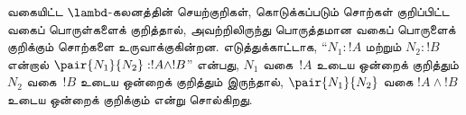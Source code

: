\documentclass[../../../include/open-logic-section]{subfiles}
\begin{document}
வகையிட்ட $\lambd$-கலனத்தின் செயற்குறிகள்,
கொடுக்கப்படும் சொற்கள் குறிப்பிட்ட வகைப் பொருள்களைக்
குறித்தால், அவற்றிலிருந்து பொருத்தமான வகைப்
பொருளைக் குறிக்கும் சொற்களை உருவாக்குகின்றன.
எடுத்துக்காட்டாக, “$N_1 : !A$ மற்றும் $N_2 : !B$
என்றால் $\pair{N_1}{N_2} : !A \land !B$”
என்பது, $N_1$ வகை~$!A$ உடைய ஒன்றைக்
குறித்தும் $N_2$ வகை~$!B$ உடைய ஒன்றைக்
குறித்தும் இருந்தால், $\pair{N_1}{N_2}$
வகை $!A \land !B$ உடைய ஒன்றைக்
குறிக்கும் என்று சொல்கிறது.
\end{document}
